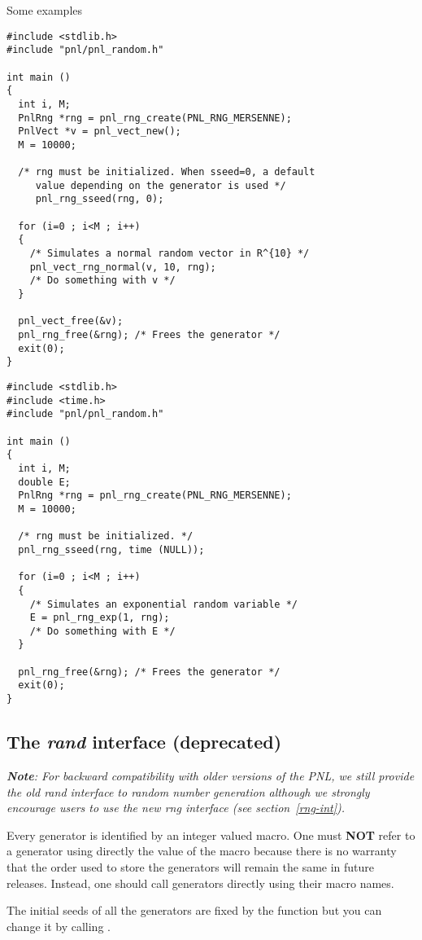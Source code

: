 Some examples
\begin{lstlisting}
#include <stdlib.h>
#include "pnl/pnl_random.h"

int main ()
{
  int i, M;
  PnlRng *rng = pnl_rng_create(PNL_RNG_MERSENNE);
  PnlVect *v = pnl_vect_new();
  M = 10000;

  /* rng must be initialized. When sseed=0, a default 
     value depending on the generator is used */
     pnl_rng_sseed(rng, 0);

  for (i=0 ; i<M ; i++)
  {
    /* Simulates a normal random vector in R^{10} */
    pnl_vect_rng_normal(v, 10, rng);
    /* Do something with v */
  }

  pnl_vect_free(&v);
  pnl_rng_free(&rng); /* Frees the generator */
  exit(0);
}
\end{lstlisting}

\begin{lstlisting}
#include <stdlib.h>
#include <time.h>
#include "pnl/pnl_random.h"

int main ()
{
  int i, M;
  double E;
  PnlRng *rng = pnl_rng_create(PNL_RNG_MERSENNE);
  M = 10000;

  /* rng must be initialized. */
  pnl_rng_sseed(rng, time (NULL));

  for (i=0 ; i<M ; i++)
  {
    /* Simulates an exponential random variable */
    E = pnl_rng_exp(1, rng);
    /* Do something with E */
  }

  pnl_rng_free(&rng); /* Frees the generator */
  exit(0);
}
\end{lstlisting}

\subsection{The {\em rand} interface (deprecated)}
\label{rand-int}

{\itshape 
\textbf{Note}:
For backward compatibility with older versions of the PNL, we still provide the old
{\em rand} interface to random number generation although we strongly encourage users
to use the new {\em rng} interface (see section~\ref{rng-int}).
}

Every generator is identified by an integer valued macro. One must {\bf NOT} refer
to a generator using directly the value of the macro  because there
is no warranty that the order used to store the generators will remain the same in
future releases.  Instead, one should call generators directly using their macro
names.

The initial seeds of all the generators are fixed by the function
 but you can change it by calling .

